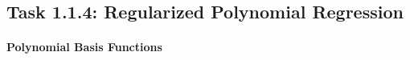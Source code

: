 \subsection{Task 1.1.4: Regularized Polynomial Regression}













\paragraph{Polynomial Basis Functions}


